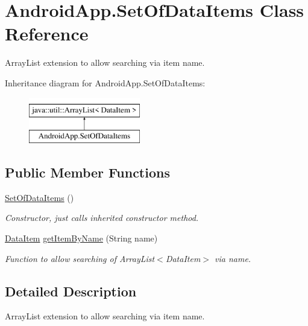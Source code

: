\hypertarget{class_android_app_1_1_set_of_data_items}{}\section{Android\+App.\+Set\+Of\+Data\+Items Class Reference}
\label{class_android_app_1_1_set_of_data_items}


Array\+List extension to allow searching via item name.  


Inheritance diagram for Android\+App.\+Set\+Of\+Data\+Items\+:\begin{figure}[H]
\begin{center}
\leavevmode
\includegraphics[height=2.000000cm]{class_android_app_1_1_set_of_data_items}
\end{center}
\end{figure}
\subsection*{Public Member Functions}
\begin{DoxyCompactItemize}
\item 
\mbox{\label{class_android_app_1_1_set_of_data_items_a719c4dffae070925492a8cca986a8337}} 
\hyperlink{class_android_app_1_1_set_of_data_items_a719c4dffae070925492a8cca986a8337}{Set\+Of\+Data\+Items} ()
\begin{DoxyCompactList}\small\item\em Constructor, just calls inherited constructor method. \end{DoxyCompactList}\item 
\hyperlink{class_android_app_1_1_data_item}{Data\+Item} \hyperlink{class_android_app_1_1_set_of_data_items_aa559ef3701bb9f59f124ddddc56a2a38}{get\+Item\+By\+Name} (String name)
\begin{DoxyCompactList}\small\item\em Function to allow searching of Array\+List$<$\+Data\+Item$>$ via name. \end{DoxyCompactList}\end{DoxyCompactItemize}


\subsection{Detailed Description}
Array\+List extension to allow searching via item name. 

